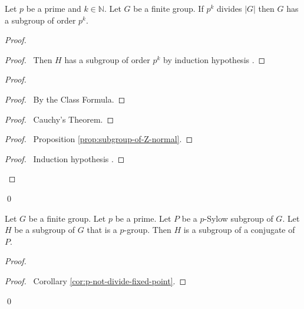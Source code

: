 \begin{thm}
Let $p$ be a prime and $k \in \mathbb{N}$. Let $G$ be a finite group. If $p^k$ divides $|G|$ then $G$ has a subgroup of order $p^k$.
\end{thm}

\begin{proof}
\pf
{}
\begin{proof}
	\pf\ Then $H$ has a subgroup of order $p^k$ by induction hypothesis .
\end{proof}
\begin{proof}
	\begin{proof}
		\pf\ By the Class Formula.
	\end{proof}
	\begin{proof}
		\pf\ Cauchy's Theorem.
	\end{proof}
	\begin{proof}
		\pf\ Proposition \ref{prop:subgroup-of-Z-normal}.
	\end{proof}
	\begin{proof}
		\pf\ Induction hypothesis .
	\end{proof}
\end{proof}
\qed
\end{proof}

\begin{thm}
Let $G$ be a finite group. Let $p$ be a prime. Let $P$ be a $p$-Sylow subgroup of $G$. Let $H$ be a subgroup of $G$ that is a $p$-group. Then $H$ is a subgroup of a conjugate of $P$.
\end{thm}

\begin{proof}
\pf
{}
\begin{proof}
	\pf\ Corollary \ref{cor:p-not-divide-fixed-point}.
\end{proof}
\qed
\end{proof}

